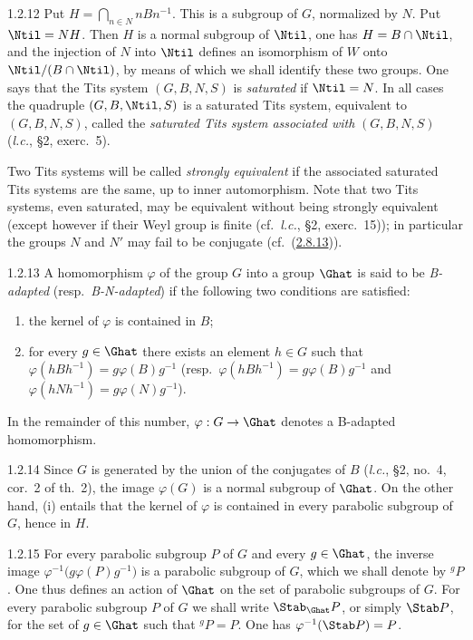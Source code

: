\documentclass[12pt,a4paper,oneside,english]{smfart}
\makeatletter
\newcommand{\btanchor}[1]{\leavevmode\Hy@raisedlink{\hypertarget{bt:#1}{}}}
\newcommand{\btref}[1]{\hyperlink{bt:#1}{#1}}
\theoremstyle{definition}
\theoremstyle{bt}
\makeatother
\begin{document}
\num{1.2.12}\btanchor{1.2.12} Put $H=\bigcap_{n\in N}nBn^{-1}$. This is a subgroup of $G$,
normalized by $N$. Put $\Ntil=NH$. Then $H$ is a normal subgroup of $\Ntil$, one has $H=B\cap\Ntil$, and the injection of $N$ into $\Ntil$ defines an isomorphism of $W$ onto $\Ntil/(B\cap\Ntil)$, by means of which we shall identify these two groups. One says that the Tits system $(G,B,N,S)$ is
\emph{saturated} if $\Ntil=N$. In all cases the quadruple $(G,B,\Ntil,S)$ is a
saturated Tits system, equivalent to $(G,B,N,S)$, called the \emph{saturated Tits system associated with} $(G,B,N,S)$ (\emph{l.c.}, \S2, exerc.~5).

Two Tits systems will be called \emph{strongly equivalent} if the associated saturated Tits systems are the same, up to inner automorphism. Note that two Tits systems, even saturated, may be equivalent without being strongly equivalent (except however if their Weyl group is finite (cf.\ \emph{l.c.},
\S2, exerc.~15)); in particular the groups $N$ and $N'$ may fail to be
conjugate (cf.~(\btref{2.8.13})).

\num{1.2.13}\btanchor{1.2.13} A homomorphism $\varphi$ of the group $G$ into a group $\Ghat$ is
said to be \emph{B-adapted} (resp.\ \emph{B-N-adapted}) if the following two conditions are satisfied:
\begin{enumerate}[label=(\roman*),leftmargin=2.4em]
\item the kernel of $\varphi$ is contained in $B$;
\item for every $g\in\Ghat$ there exists an element $h\in G$ such that
  $\varphi(hBh^{-1})=g\varphi(B)g^{-1}$ (resp.\   $\varphi(hBh^{-1})=g\varphi(B)g^{-1}$ and   $\varphi(hNh^{-1})=g\varphi(N)g^{-1}$).
\end{enumerate}
In the remainder of this number, $\varphi:G\rightarrow\Ghat$ denotes a B-adapted homomorphism.

\num{1.2.14}\btanchor{1.2.14} Since $G$ is generated by the union of the conjugates of $B$
(\emph{l.c.}, \S2, no.~4, cor.~2 of th.~2), the image $\varphi(G)$ is a normal subgroup of $\Ghat$. On the other hand, (i) entails that the kernel of $\varphi$ is contained in every parabolic subgroup of $G$, hence in $H$.

\num{1.2.15}\btanchor{1.2.15} For every parabolic subgroup $P$ of $G$ and every $g\in\Ghat$,
the inverse image $\varphi^{-1}\bigl(g\varphi(P)g^{-1}\bigr)$ is a parabolic subgroup of $G$, which we shall denote by $^{g}P$. One thus defines an action of $\Ghat$ on the set of parabolic subgroups of $G$. For every parabolic subgroup $P$ of $G$ we shall write $\Stab_{\Ghat}P$, or simply $\Stab P$, for the set of $g\in\Ghat$ such that $^{g}P=P$. One has $\varphi^{-1}(\Stab P)=P$.
\end{document}

